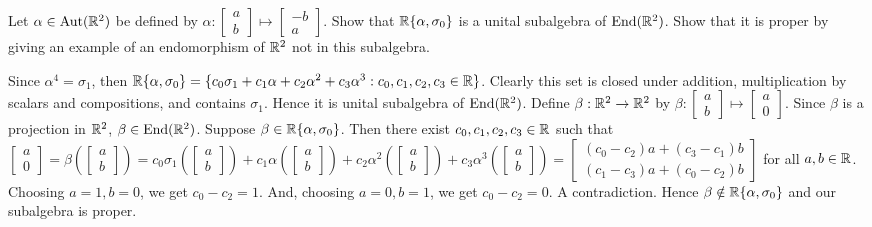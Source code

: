 \begin{problem}[Golan 325]
Let $\alpha \in \operatorname{Aut}(\mathbb{R}^2)$ be defined by 
$\alpha: 
\begin{bmatrix} a\\ b \end{bmatrix} 
\mapsto 
\begin{bmatrix} -b\\ a \end{bmatrix}$.
Show that $\mathbb{R}\{\alpha, \sigma_0\}$ is a unital subalgebra of $\operatorname{End}(\mathbb{R}^2)$.  Show
that it is proper by giving an example of an endomorphism of $\mathbb{R}^2$ not in this
subalgebra. 
\end{problem}
\smallskip
\begin{solution}

Since $\alpha^4=\sigma_1$, then $\mathbb{R}\{\alpha, \sigma_0\}=\{c_0\sigma_1+c_1\alpha+c_2\alpha^2+c_3\alpha^3: c_0, c_1, c_2, c_3 \in \mathbb{R}\}$. Clearly this set is closed under addition, multiplication by scalars and compositions, and contains $\sigma_1$. Hence it is unital subalgebra of $\operatorname{End}(\mathbb{R}^2)$.
\vskip2mm
Define $\beta: \mathbb{R}^2 \rightarrow \mathbb{R}^2$ by $\beta: 
\begin{bmatrix} a\\ b \end{bmatrix} 
\mapsto 
\begin{bmatrix} a\\ 0 \end{bmatrix}$.
Since $\beta$ is a projection in $\mathbb{R}^2$, $\beta \in \operatorname{End}(\mathbb{R}^2)$. Suppose $\beta \in \mathbb{R}\{\alpha, \sigma_0\}$. Then there exist $c_0, c_1, c_2, c_3 \in \mathbb{R}$ such that $\begin{bmatrix} a\\ 0 \end{bmatrix}=\beta(\begin{bmatrix} a\\ b \end{bmatrix})=c_0\sigma_1(\begin{bmatrix} a\\ b \end{bmatrix})+c_1\alpha(\begin{bmatrix} a\\ b \end{bmatrix})+c_2\alpha^2(\begin{bmatrix} a\\ b \end{bmatrix})+c_3\alpha^3(\begin{bmatrix} a\\ b \end{bmatrix})=\begin{bmatrix} (c_0-c_2)a+(c_3-c_1)b\\ (c_1-c_3)a+(c_0-c_2)b \end{bmatrix}$ for all $a, b \in \mathbb{R}$. Choosing $a=1, b=0$, we get $c_0-c_2=1$. And, choosing $a=0, b=1$, we get $c_0-c_2=0$. A contradiction. Hence $\beta \notin \mathbb{R}\{\alpha, \sigma_0\}$ and our subalgebra is proper.

\end{solution}

